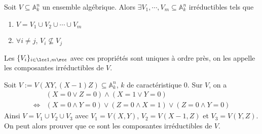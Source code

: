             \begin{theo}
                Soit $V \subseteq \mathbb{A}_k^n$ un ensemble algébrique. Alors $\exists V_1, \cdots, V_m \subseteq \mathbb{A}_k^n$ irréductibles tels que
                \begin{enumerate}
                    \item $V = V_1 \cup V_2 \cup \cdots \cup V_m$
                    \item $\forall i \neq j$, $V_i \nsubseteq V_j$
                \end{enumerate}
                Les $\{V_i\}_{i \in \lcc 1,m \rcc}$ avec ces propriétés sont uniques à ordre près, on les appelle les composantes irréductibles de $V$.
            \end{theo}
            \begin{expl}
                Soit $V := V(XY, (X-1)Z) \subseteq \mathbb{A}_k^n$, $k$ de caractéristique $0$. Sur $V$, on a 
                \begin{align*}
                    &(X = 0 \lor Z = 0) \land (X = 1 \lor Y = 0) \\
                    \iff &(X = 0 \land Y = 0) \lor (Z = 0 \land X = 1) \lor (Z = 0 \land Y = 0)
                \end{align*}
                Ainsi $V = V_1 \cup V_2 \cup V_3$ avec $V_1 = V(X,Y)$, $V_2 = V(X-1, Z)$ et $V_3 = V(Y,Z)$. On peut alors prouver que ce sont les composantes irréductibles de $V$.
            \end{expl}
